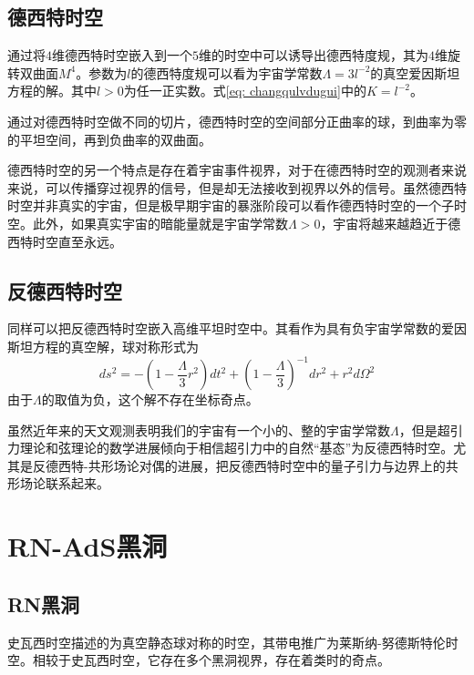 \subsection{德西特时空}
通过将$4$维德西特时空嵌入到一个$5$维的时空中可以诱导出德西特度规，其为$4$维旋转双曲面$M^4$。参数为$l$的德西特度规可以看为宇宙学常数$\Lambda=3l^{-2}$的真空爱因斯坦方程的解。其中$l>0$为任一正实数。式\eqref{eq: changqulvdugui}中的$K=l^{-2}$。

通过对德西特时空做不同的切片，德西特时空的空间部分正曲率的球，到曲率为零的平坦空间，再到负曲率的双曲面。

德西特时空的另一个特点是存在着宇宙事件视界，对于在德西特时空的观测者来说来说，可以传播穿过视界的信号，但是却无法接收到视界以外的信号\citep{witten2001quantum}。虽然德西特时空并非真实的宇宙，但是极早期宇宙的暴涨阶段可以看作德西特时空的一个子时空。此外，如果真实宇宙的暗能量就是宇宙学常数$\Lambda>0$，宇宙将越来越趋近于德西特时空直至永远\citep{梁灿彬2006微分几何入门与广义相对论}。
\subsection{反德西特时空}
同样可以把反德西特时空嵌入高维平坦时空中。其看作为具有负宇宙学常数的爱因斯坦方程的真空解，球对称形式为
\begin{equation}
    ds^2=-\left(1-\frac{\Lambda}{3}r^2\right)dt^2+\left(1-\frac{\Lambda}{3}\right)^{-1}dr^2+r^2d\Omega^2
\end{equation}
由于$\Lambda$的取值为负，这个解不存在坐标奇点。

虽然近年来的天文观测表明我们的宇宙有一个小的、整的宇宙学常数$\Lambda$\citep{梁灿彬2006微分几何入门与广义相对论}，但是超引力理论和弦理论的数学进展倾向于相信超引力中的自然“基态”为反德西特时空。尤其是反德西特-共形场论对偶的进展，把反德西特时空中的量子引力与边界上的共形场论联系起来\citep{maldacena1999large,aharony2000large}。
\section{RN-AdS黑洞}
\subsection{RN黑洞}
史瓦西时空描述的为真空静态球对称的时空，其带电推广为莱斯纳-努德斯特伦时空。相较于史瓦西时空，它存在多个黑洞视界，存在着类时的奇点。

